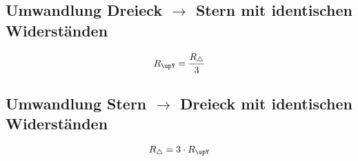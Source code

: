 \subsection{Umwandlung Dreieck $\to$ Stern mit identischen Widerständen}
\[ R_{\upY} = \frac{R_{\triangle}}{3} \]

\subsection{Umwandlung Stern $\to$ Dreieck mit identischen Widerständen}
\[ R_{\triangle} = 3 \cdot R_{\upY} \]